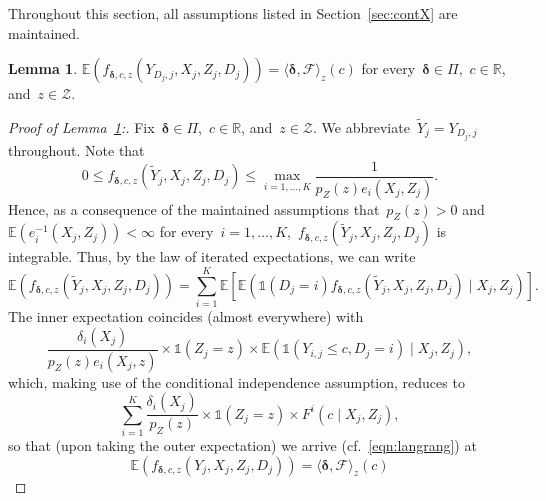 \documentclass[11pt, a4paper]{article}
\newcommand{\R}{\mathbb{R}}
\theoremstyle{definition}
\newtheorem{lemma}[theorem]{Lemma}
\begin{document}
Throughout this section, all assumptions listed in Section~\ref{sec:contX} are maintained.

\begin{lemma}\label{lem:expf}
$
\mathbb{E}(f_{\bm{\delta}, c, z}(Y_{D_j, j}, X_j, Z_j, D_j)) = \langle \bm{\delta}, \mathcal{F} \rangle_z(c)
$ for every~$\bm{\delta} \in \Pi$,~$c\in \R$, and~$z \in \mathcal{Z}$.

\end{lemma} 

\begin{proof}[Proof of Lemma~\ref{lem:expf}:]
Fix~$\bm{\delta} \in \Pi$,~$c\in \R$, and~$z \in \mathcal{Z}$. We abbreviate~$\tilde{Y}_j = Y_{D_j, j}$ throughout. Note that $$0 \leq f_{\bm{\delta}, c, z}(\tilde{Y}_j, X_j, Z_j, D_j) \leq \max_{i = 1, \hdots, K} \frac{1}{p_Z(z) e_i(X_j, Z_j)}.$$ Hence, as a consequence of the maintained assumptions that~$p_Z(z) > 0$ and~$\mathbb{E}(e_i^{-1}(X_j, Z_j)) < \infty$ for every~$i = 1, \hdots, K$,~$f_{\bm{\delta}, c, z}(\tilde{Y}_j, X_j, Z_j, D_j)$ is integrable. Thus, by the law of iterated expectations, we can write
\begin{equation*}
\mathbb{E}(f_{\bm{\delta}, c, z}(\tilde{Y}_j, X_j, Z_j, D_j)) =  \sum_{i =1}^K \mathbb{E}\left[\mathbb{E}\left(\mathds{1}(D_j = i)f_{\bm{\delta}, c, z}(\tilde{Y}_j, X_j, Z_j, D_j) \mid X_j, Z_j\right)\right].
\end{equation*}
The inner expectation coincides (almost everywhere) with
%
\begin{equation*}
\frac{\delta_i(X_j)}{p_Z(z)e_i(X_j, z)} \times \mathds{1}(Z_j = z) \times \mathbb{E}(\mathds{1}(Y_{i,j} \leq c, D_j = i) \mid X_j, Z_j),
\end{equation*}
%
which, making use of the conditional independence assumption, reduces to
%
\begin{equation*}
\sum_{i = 1}^K \frac{\delta_i(X_j)}{p_Z(z)} \times \mathds{1}(Z_j = z)  \times F^i(c \mid X_j, Z_j),
\end{equation*}
%
so that (upon taking the outer expectation) we arrive (cf.~\eqref{eqn:langrang}) at
\begin{equation*}
\mathbb{E}(f_{\bm{\delta}, c, z}(Y_j, X_j, Z_j, D_j)) = \langle \bm{\delta}, \mathcal{F} \rangle_z(c)
\end{equation*}

\end{proof}
\end{document}
